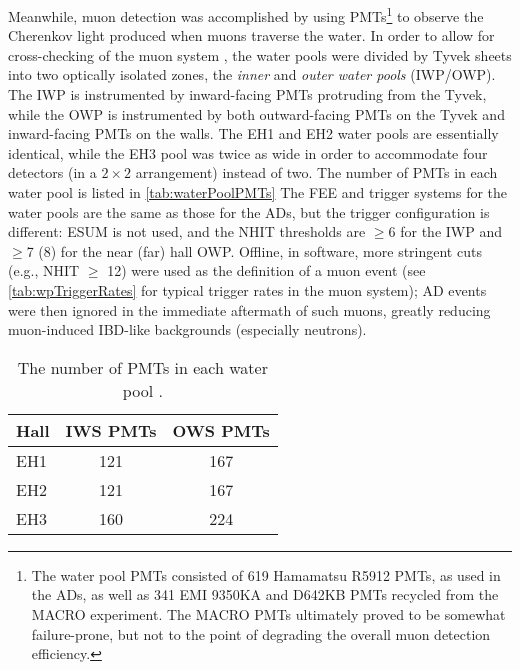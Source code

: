 \documentclass[../thesis.tex]{subfiles}
\begin{document}
Meanwhile, muon detection was accomplished by using PMTs\footnote{The water pool PMTs consisted of 619 Hamamatsu R5912 PMTs, as used in the ADs, as well as 341 EMI 9350KA and D642KB PMTs recycled from the MACRO experiment. The MACRO PMTs ultimately proved to be somewhat failure-prone, but not to the point of degrading the overall muon detection efficiency.} to observe the Cherenkov light produced when muons traverse the water. In order to allow for cross-checking of the muon system \cite{Hack_2014}, the water pools were divided by Tyvek sheets into two optically isolated zones, the \emph{inner} and \emph{outer water pools} (IWP/OWP). The IWP is instrumented by inward-facing PMTs protruding from the Tyvek, while the OWP is instrumented by both outward-facing PMTs on the Tyvek and inward-facing PMTs on the walls. The EH1 and EH2 water pools are essentially identical, while the EH3 pool was twice as wide in order to accommodate four detectors (in a $2\times2$ arrangement) instead of two. The number of PMTs in each water pool is listed in \autoref{tab:waterPoolPMTs} The FEE and trigger systems for the water pools are the same as those for the ADs, but the trigger configuration is different: ESUM is not used, and the NHIT thresholds are $\geq$6 for the IWP and $\ge$7 (8) for the near (far) hall OWP. Offline, in software, more stringent cuts (e.g., NHIT $\geq$ 12) were used as the definition of a muon event (see \autoref{tab:wpTriggerRates} for typical trigger rates in the muon system); AD events were then ignored in the immediate aftermath of such muons, greatly reducing muon-induced IBD-like backgrounds (especially neutrons).

\begin{table}[h]
  \begin{tabular}{lcc}
    \toprule
    Hall & IWS PMTs & OWS PMTs \\
    \midrule
    EH1 & 121 & 167 \\
    EH2 & 121 & 167 \\
    EH3 & 160 & 224 \\
    \bottomrule
  \end{tabular}
  \caption{The number of PMTs in each water pool \cite{AN2016133}.}
  \label{tab:waterPoolPMTs}
\end{table}
\end{document}
